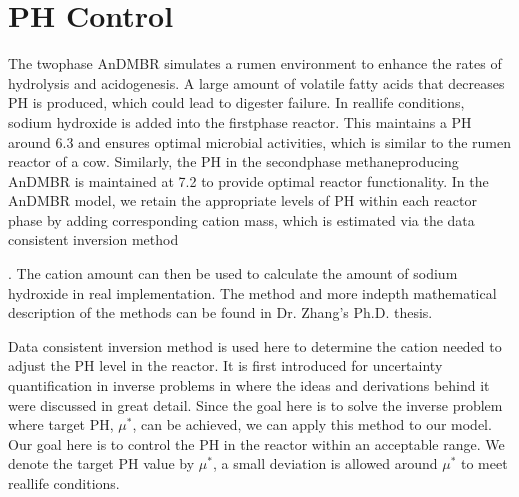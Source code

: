 \documentclass[a4paper,10pt,english]{sphinxmanual}
\begin{document}
{
\begin{sphinxVerbatim}[commandchars=\\\{\}]
\llap{\color{nbsphinxin}[ ]:\,\hspace{\fboxrule}\hspace{\fboxsep}}
\end{sphinxVerbatim}
}


\section{PH Control}
\label{\detokenize{phcontrol:ph-control}}\label{\detokenize{phcontrol::doc}}
\sphinxAtStartPar
The two\sphinxhyphen{}phase AnDMBR simulates a rumen environment to enhance the rates of hydrolysis and acidogenesis. A large amount of volatile fatty acids that decreases PH is produced, which could lead to digester failure. In real\sphinxhyphen{}life conditions, sodium hydroxide is added into the first\sphinxhyphen{}phase reactor. This maintains a PH around 6.3 and ensures optimal microbial activities, which is similar to the rumen reactor of a cow. Similarly, the PH in the second\sphinxhyphen{}phase methane\sphinxhyphen{}producing AnDMBR is maintained at 7.2 to provide optimal reactor functionality. In the AnDMBR model, we retain the appropriate levels of PH within each reactor phase by adding corresponding cation mass, which is estimated via the data consistent inversion method %
\begin{footnote}[1]\sphinxAtStartFootnote
{}
%
\end{footnote}. The cation amount can then be used to calculate the amount of sodium hydroxide in real implementation. The method and more in\sphinxhyphen{}depth mathematical description of the  methods can be found in Dr. Zhang’s Ph.D. thesis.

\sphinxAtStartPar
{}

\sphinxAtStartPar
Data consistent inversion method is used here to determine the cation needed to adjust the PH level in the reactor. It is first introduced for uncertainty quantification in inverse problems in \sphinxfootnotemark[1] where the ideas and derivations behind it were discussed in great detail. Since the goal here is to solve the inverse problem where target PH, \(\mu^*\), can be achieved, we can apply this method to our model. Our goal here is to control the PH in the reactor within an acceptable range. We denote the target PH value by \(\mu^*\), a small deviation is allowed around \(\mu^*\) to meet real\sphinxhyphen{}life conditions.
\end{document}

